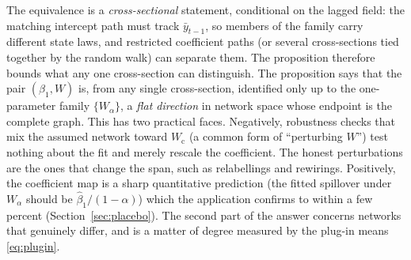 \documentclass[12pt]{article}
\theoremstyle{plain}
\theoremstyle{definition}
\theoremstyle{remark}
\newcommand{\Wc}{W_{\mathrm{c}}}
\begin{document}
The equivalence is a \emph{cross-sectional} statement, conditional on the lagged field: the matching intercept path must track $\bar y_{t-1}$, so members of the family carry different state laws, and restricted coefficient paths (or several cross-sections tied together by the random walk) can separate them. The proposition therefore bounds what any one cross-section can distinguish.
The proposition says that the pair $(\beta_1,W)$ is, from any single cross-section, identified only up to the one-parameter family $\{W_\alpha\}$, a \emph{flat direction} in network space whose endpoint is the complete graph. This has two practical faces. Negatively, robustness checks that mix the assumed network toward $\Wc$ (a common form of ``perturbing $W$'') test nothing about the fit and merely rescale the coefficient. The honest perturbations are the ones that change the span, such as relabellings and rewirings. Positively, the coefficient map is a sharp quantitative prediction (the fitted spillover under $W_\alpha$ should be $\hat\beta_1/(1-\alpha)$) which the application confirms to within a few percent (Section~\ref{sec:placebo}). The second part of the answer concerns networks that genuinely differ, and is a matter of degree measured by the plug-in means \eqref{eq:plugin}.
\end{document}
